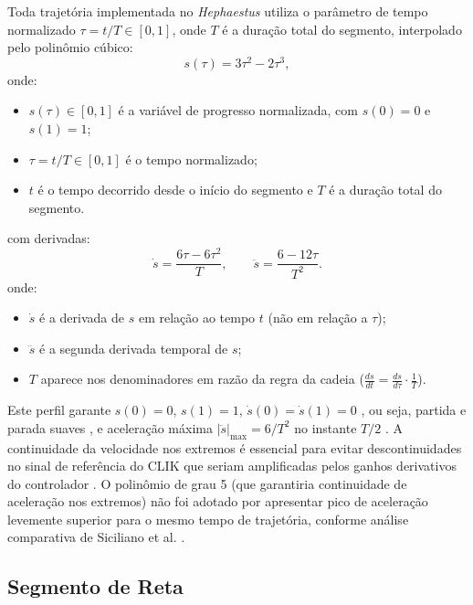 Toda trajetória implementada no \textit{Hephaestus} utiliza o parâmetro de tempo normalizado $\tau = t / T \in [0,1]$, onde $T$ é a duração total do segmento, interpolado pelo polinômio cúbico:
\begin{equation}
    s(\tau) = 3\tau^2 - 2\tau^3,
    \label{eq:cubic_s}
\end{equation}
onde:
\begin{itemize}
    \item $s(\tau) \in [0,1]$ é a variável de progresso normalizada, com $s(0)=0$ e $s(1)=1$;
    \item $\tau = t/T \in [0,1]$ é o tempo normalizado;
    \item $t$ é o tempo decorrido desde o início do segmento e $T$ é a duração total do segmento.
\end{itemize}
com derivadas:
\begin{equation}
    \dot{s} = \frac{6\tau - 6\tau^2}{T}, \qquad
    \ddot{s} = \frac{6 - 12\tau}{T^2}.
    \label{eq:cubic_ds}
\end{equation}
onde:
\begin{itemize}
    \item $\dot{s}$ é a derivada de $s$ em relação ao tempo $t$ (não em relação a $\tau$);
    \item $\ddot{s}$ é a segunda derivada temporal de $s$;
    \item $T$ aparece nos denominadores em razão da regra da cadeia ($\frac{ds}{dt} = \frac{ds}{d\tau}\cdot\frac{1}{T}$).
\end{itemize}

Este perfil garante $s(0) = 0$, $s(1) = 1$, $\dot{s}(0) = \dot{s}(1) = 0$ , ou seja, partida e parada suaves , e aceleração máxima $|\ddot{s}|_{\max} = 6/T^2$ no instante $T/2$ \cite{siciliano2009robotics}. A continuidade da velocidade nos extremos é essencial para evitar descontinuidades no sinal de referência do CLIK que seriam amplificadas pelos ganhos derivativos do controlador \cite{craig1989introduction}. O polinômio de grau 5 (que garantiria continuidade de aceleração nos extremos) não foi adotado por apresentar pico de aceleração levemente superior para o mesmo tempo de trajetória, conforme análise comparativa de Siciliano et al. \cite{siciliano2009robotics}.

\subsection{Segmento de Reta}

